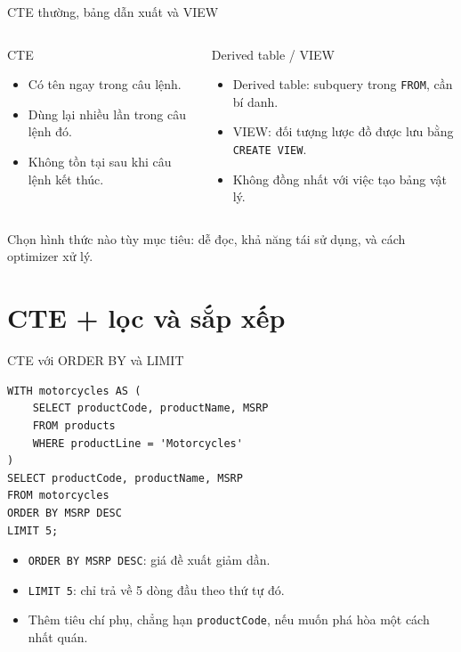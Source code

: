 \documentclass[aspectratio=169,10pt]{beamer}
\newcommand{\code}[1]{\texttt{#1}}
\begin{document}
\begin{frame}[fragile]{CTE thường, bảng dẫn xuất và VIEW}
\begin{columns}[T,onlytextwidth]
\begin{block}{CTE}
\small
\begin{itemize}
\item Có tên ngay trong câu lệnh.
\item Dùng lại nhiều lần trong câu lệnh đó.
\item Không tồn tại sau khi câu lệnh kết thúc.
\end{itemize}
\end{block}
\begin{block}{Derived table / VIEW}
\small
\begin{itemize}
\item Derived table: subquery trong \texttt{FROM}, cần bí danh.
\item VIEW: đối tượng lược đồ được lưu bằng \texttt{CREATE VIEW}.
\item Không đồng nhất với việc tạo bảng vật lý.
\end{itemize}
\end{block}
\end{columns}
\vspace{.3em}
\small Chọn hình thức nào tùy mục tiêu: dễ đọc, khả năng tái sử dụng, và cách optimizer xử lý.
\end{frame}

\section{CTE + lọc và sắp xếp}

\begin{frame}[fragile]{CTE với ORDER BY và LIMIT}
\small
\begin{lstlisting}[basicstyle=\ttfamily\scriptsize]
WITH motorcycles AS (
    SELECT productCode, productName, MSRP
    FROM products
    WHERE productLine = 'Motorcycles'
)
SELECT productCode, productName, MSRP
FROM motorcycles
ORDER BY MSRP DESC
LIMIT 5;
\end{lstlisting}
\vspace{.1em}
\begin{itemize}
\item \code{ORDER BY MSRP DESC}: giá đề xuất giảm dần.
\item \code{LIMIT 5}: chỉ trả về 5 dòng đầu theo thứ tự đó.
\item Thêm tiêu chí phụ, chẳng hạn \code{productCode}, nếu muốn phá hòa một cách nhất quán.
\end{itemize}
\end{frame}
\end{document}
